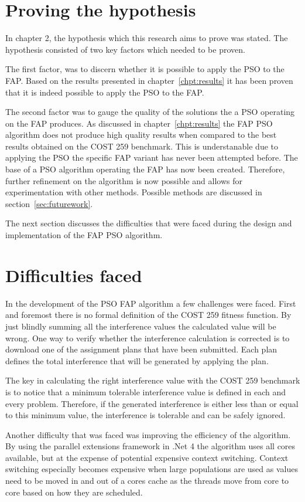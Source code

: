 \section{Proving the hypothesis}
In chapter 2, the hypothesis which this research aims to prove was stated. The hypothesis consisted of two key factors which needed to be proven. 

The first factor, was to discern whether it is possible to apply the \gls{PSO} to the \gls{FAP}. Based on the results presented in chapter~\ref{chpt:results} it has been proven that it is indeed possible to apply the PSO to the FAP.

The second factor was to gauge the quality of the solutions the a PSO operating on the FAP produces. As discussed in chapter~\ref{chpt:results} the FAP PSO algorithm does not produce high quality results when compared to the best results obtained on the COST 259 benchmark. This is understanable due to applying the PSO the specific FAP variant has never been attempted before. The base of a PSO algorithm operating the FAP has now been created. Therefore, further refinement on the algorithm is now possible and allows for experimentation with other methods. Possible methods are discussed in section~\ref{sec:futurework}.

The next section discusses the difficulties that were faced during the design and implementation of the FAP PSO algorithm. 
\section{Difficulties faced}
In the development of the PSO FAP algorithm a few challenges were faced. First and foremost there is no formal definition of the COST 259 fitness function. By just blindly summing all the interference values the calculated value will be wrong. One way to verify whether the interference calculation is corrected is to download one of the assignment plans that have been submitted. Each plan defines the total interference that will be generated by applying the plan. 

The key in calculating the right interference value with the COST 259 benchmark is to notice that a minimum tolerable interference value is defined in each and every problem. Therefore, if the generated interference is either less than or equal to this minimum value, the interference is tolerable and can be safely ignored.

Another difficulty that was faced was improving the efficiency of the algorithm. By using the parallel extensions framework in .Net 4 the algorithm uses all cores available, but at the expense of potential expensive context switching. Context switching especially becomes expensive when large populations are used as values need to be moved in and out of a cores cache as the threads move from core to core based on how they are scheduled.

